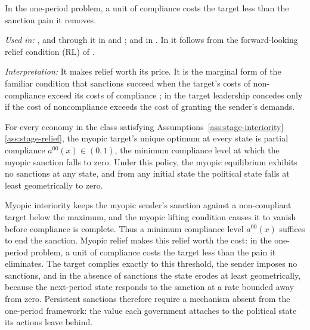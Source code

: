 \begin{assumption}
\label{ass:stage-relief}
In the one-period problem, a unit of compliance costs the target less than the
sanction pain it removes.
\end{assumption}
\noindent\textit{Used in:} , and through it in
 and ; and in
. In  it follows from the
forward-looking relief condition \textup{(RL)} of .\par
\noindent\textit{Interpretation:} It makes relief worth its price. It is the marginal
form of the familiar condition that sanctions succeed when the target's costs of
non-compliance exceed its costs of compliance
\citep[p.~50]{HufbauerSchottElliott2007}; in \citet[p.~566]{Marinov2005} the target
leadership concedes only if the cost of noncompliance exceeds the cost of granting
the sender's demands.

\begin{proposition}
\label{prop:myopic-benchmark}
For every economy in the class satisfying
Assumptions~\ref{ass:stage-interiority}--\ref{ass:stage-relief}, the myopic target's
unique optimum at every state is partial compliance $a^{00}(x)\in(0,1)$, the minimum
compliance level at which the myopic sanction falls to zero. Under this policy, the
myopic equilibrium exhibits no sanctions at any state, and from any initial state the political state falls at least geometrically to zero.
\end{proposition}

 Myopic
interiority keeps the myopic sender's sanction against a non-compliant target below
the maximum, and the myopic lifting condition causes it to vanish before compliance
is complete. Thus a minimum compliance level $a^{00}(x)$ suffices to end the
sanction. Myopic relief makes this relief worth the cost: in the one-period problem,
a unit of compliance costs the target less than the pain it eliminates. The target
complies exactly to this threshold, the sender imposes no sanctions, and in the
absence of sanctions the state erodes at least geometrically, because the next-period
state responds to the sanction at a rate bounded away from zero. Persistent sanctions
therefore require a mechanism absent from the one-period framework: the value each
government attaches to the political state its actions leave behind.

